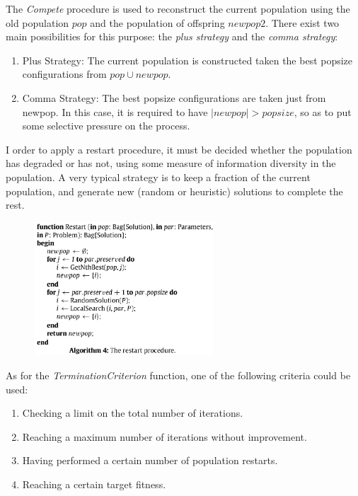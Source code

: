 \documentclass[]{beamer}
\begin{document}
{{ }
 
 {
The \emph{Compete} procedure is used to reconstruct the current
population using the old population $pop$ and the population of
offspring $newpop2$. There exist two main
possibilities for this purpose: the \textit{plus strategy} and the \textit{comma
strategy}:
	\vspace{0.5cm}
	\begin{enumerate}
	\item Plus Strategy: The current population is constructed taken the best popsize configurations from $pop \cup newpop$.\\
		\vspace{0.5cm}
	\item Comma Strategy: The best popsize configurations are taken just from newpop. In this case, it is required to have $|newpop| >popsize$, so as to put some selective pressure on the process.\\
	\end{enumerate}
 }
 {
I order to apply a restart procedure, it must be decided whether the population has
degraded or has not, using some measure of information diversity
in the population. A very typical strategy is to
keep a fraction of the current population, and generate new (random
or heuristic) solutions to complete the rest.\\

    \begin{figure}
    \centering
    \includegraphics[width = 0.6\textwidth]{alg4.png}
    \caption{}
  	\end{figure}
  	
 }
 {
  As for the \textit{TerminationCriterion} function, one of the following criteria could be used:\\
  \vspace{0.5cm}
   \begin{enumerate}
   \item Checking a limit on the total number of iterations.
   \item Reaching a maximum number of iterations without improvement.
   \item Having performed a certain number of population restarts.
   \item Reaching a certain target fitness.
   \end{enumerate}
 }
}
\end{document}
